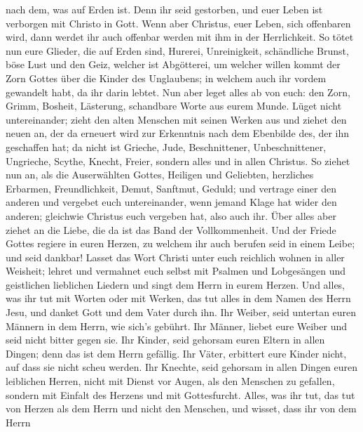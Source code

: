 nach dem, was auf Erden ist.  Denn ihr seid gestorben, und
euer Leben ist verborgen mit Christo in Gott.  Wenn aber
Christus, euer Leben, sich offenbaren wird, dann werdet ihr auch
offenbar werden mit ihm in der Herrlichkeit.  So tötet nun
eure Glieder, die auf Erden sind, Hurerei, Unreinigkeit, schändliche
Brunst, böse Lust und den Geiz, welcher ist Abgötterei,  um
welcher willen kommt der Zorn Gottes über die Kinder des Unglaubens;
 in welchem auch ihr vordem gewandelt habt, da ihr darin
lebtet.  Nun aber leget alles ab von euch: den Zorn, Grimm,
Bosheit, Lästerung, schandbare Worte aus eurem Munde.  Lüget
nicht untereinander; zieht den alten Menschen mit seinen Werken aus
 und ziehet den neuen an, der da erneuert wird zur
Erkenntnis nach dem Ebenbilde des, der ihn geschaffen hat; 
da nicht ist Grieche, Jude, Beschnittener, Unbeschnittener, Ungrieche,
Scythe, Knecht, Freier, sondern alles und in allen Christus.
 So ziehet nun an, als die Auserwählten Gottes, Heiligen
und Geliebten, herzliches Erbarmen, Freundlichkeit, Demut, Sanftmut,
Geduld;  und vertrage einer den anderen und vergebet euch
untereinander, wenn jemand Klage hat wider den anderen; gleichwie
Christus euch vergeben hat, also auch ihr.  Über alles aber
ziehet an die Liebe, die da ist das Band der Vollkommenheit.
 Und der Friede Gottes regiere in euren Herzen, zu welchem
ihr auch berufen seid in einem Leibe; und seid dankbar! 
Lasset das Wort Christi unter euch reichlich wohnen in aller Weisheit;
lehret und vermahnet euch selbst mit Psalmen und Lobgesängen und
geistlichen lieblichen Liedern und singt dem Herrn in eurem Herzen.
 Und alles, was ihr tut mit Worten oder mit Werken, das tut
alles in dem Namen des Herrn Jesu, und danket Gott und dem Vater durch
ihn.  Ihr Weiber, seid untertan euren Männern in dem Herrn,
wie sich's gebührt.  Ihr Männer, liebet eure Weiber und
seid nicht bitter gegen sie.  Ihr Kinder, seid gehorsam
euren Eltern in allen Dingen; denn das ist dem Herrn gefällig.
 Ihr Väter, erbittert eure Kinder nicht, auf dass sie nicht
scheu werden.  Ihr Knechte, seid gehorsam in allen Dingen
euren leiblichen Herren, nicht mit Dienst vor Augen, als den Menschen zu
gefallen, sondern mit Einfalt des Herzens und mit Gottesfurcht.
 Alles, was ihr tut, das tut von Herzen als dem Herrn und
nicht den Menschen,  und wisset, dass ihr von dem Herrn
